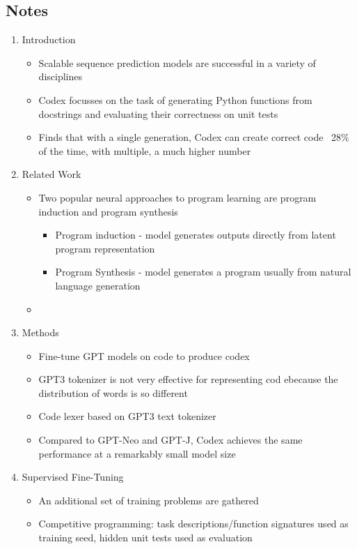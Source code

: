 \documentclass{article}
\begin{document}
\subsection*{Notes}

\begin{enumerate}
	\item Introduction
	\begin{itemize}
		\item Scalable sequence prediction models are successful in a variety of disciplines
		\item Codex focusses on the task of generating Python functions from docstrings and evaluating their correctness on unit tests
		\item Finds that with a single generation, Codex can create correct code ~28\% of the time, with multiple, a much higher number
	\end{itemize}
	\item Related Work
	\begin{itemize}
		\item Two popular neural approaches to program learning are program induction and program synthesis
		\begin{itemize}
			\item Program induction - model generates outputs directly from latent program representation
			\item Program Synthesis - model generates a program usually from natural language generation
		\end{itemize}
		\item 
	\end{itemize}
	\item Methods
	\begin{itemize}
		\item Fine-tune GPT models on code to produce codex
		\item GPT3 tokenizer is not very effective for representing cod ebecause the distribution of words is so different
		\item Code lexer based on GPT3 text tokenizer
		\item Compared to GPT-Neo and GPT-J, Codex achieves the same performance at a remarkably small model size
	\end{itemize}
	\item Supervised Fine-Tuning
	\begin{itemize}
		\item An additional set of training problems are gathered
		\item Competitive programming: task descriptions/function signatures used as training seed, hidden unit tests used as evaluation

\end{itemize}
\end{enumerate}
\end{document}

